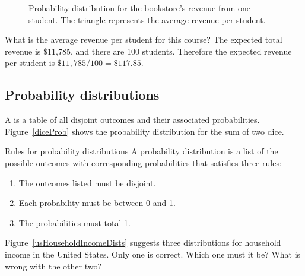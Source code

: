 \begin{figure}[hhh]
\centering
  \caption{Probability distribution for the bookstore's revenue from one student.   The triangle represents the average revenue per student.}
\label{bookCostDist}
\end{figure}

\begin{examplewrap}
\begin{nexample}{What is the average revenue per student for this course?}\label{revFromStudent}
The expected total revenue is \$11,785, and there are 100 students. Therefore the expected revenue per student is $\$11,785/100 =  \$117.85$.
\end{nexample}
\end{examplewrap}


\subsection{Probability distributions}

A  is a table of all disjoint outcomes and their associated probabilities. Figure~\ref{diceProb} shows the probability distribution for the sum of two dice.

\begin{onebox}{Rules for probability distributions}
A probability distribution is a list of the possible outcomes with corresponding probabilities that satisfies three rules: \vspace{-2mm}
\begin{enumerate}
\setlength{\itemsep}{0mm}
\item The outcomes listed must be disjoint.
\item Each probability must be between 0 and 1.
\item The probabilities must total 1. \vspace{1mm}
\end{enumerate}\end{onebox}

\begin{exercisewrap}
\begin{nexercise}\label{usHouseholdIncomeDistsExercise}
Figure~\ref{usHouseholdIncomeDists} suggests three distributions for household income in the United States. Only one is correct. Which one must it be? What is wrong with the other two?\footnotemark
\end{nexercise}
\end{exercisewrap}

